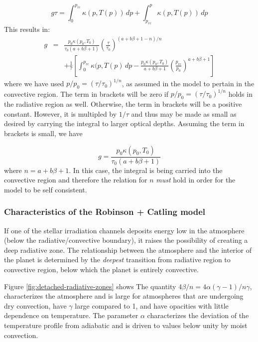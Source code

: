 \documentclass{emulateapj}
\begin{document}
\begin{equation}
  g \tau = \int_0^{p_{rc}} \kappa(p, T(p)) \, dp + \int_{p_{rc}}^p \kappa(p, T(p)) \, dp 
\end{equation}
This results in:
\begin{eqnarray}
  g &=& \frac{p_0 \kappa(p_0, T_0)}{\tau_0 (a + b\beta + 1)}
  \left(\frac{\tau}{\tau_0}\right)^{(a+b\beta+1 - n)/n}
\nonumber \\
& & + \frac{1}{\tau} \left[ \int_0^{p_{rc}} \kappa(p, T(p) \, dp
- \frac{p_0 \kappa(p_0, T_0)}{a+b\beta+1} 
\left(\frac{p_{rc}}{p_0}\right)^{a+b\beta+1}\right]
\end{eqnarray}
where we have used $p/p_0 = (\tau/\tau_0)^{1/n}$, as assumed in the
 model to pertain in the convective
region.  The term in brackets will be zero if $p/p_0 =
(\tau/\tau_0)^{1/n}$ holds in the radiative region as well.  Otherwise,
the term in brackets will be a positive constant.  However, it is
multipled by $1/\tau$ and thus may be made as small as desired by
carrying the integral to larger optical depths.  Assuming the term in
brackets is small, we have

\begin{equation}
  g = \frac{p_0 \kappa(p_0, T_0)}{\tau_0 (a + b\beta + 1)}
\end{equation}
where $n = a+b\beta+1$.  In this case, the integral is being carried
into the convective region and therefore the relation for $n$ {\em
  must} hold in order for the  model
to be self consistent.   

\subsubsection{Characteristics of the Robinson + Catling model}

If one of the stellar irradiation channels deposits energy low in the
atmosphere (below the radiative/convective boundary), it raises the
possibility of creating a deep radiative zone.  The relationship
between the atmosphere and the interior of the planet is determined by
the {\em deepest} transition from radiative region to convective
region, below which the planet is entirely convective.  

Figure \ref{fig:detached-radiative-zones} shows The quantity $4
\beta/n = 4 \alpha (\gamma-1)/n\gamma$, characterizes the atmosphere
and is large for atmospheres that are undergoing dry convection, have
$\gamma$ large compared to 1, and have opacities with little dependence
on temperature.  The parameter $\alpha$ characterizes the deviation of
the temperature profile from adiabatic and is driven to values below
unity by moist convection.
\end{document}

